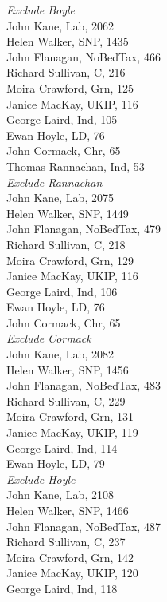 \documentclass[a4paper,openany,10pt]{book}
\begin{document}
\emph{Exclude Boyle}\\
John Kane, Lab, 2062\\
Helen Walker, SNP, 1435\\
John Flanagan, NoBedTax, 466\\
Richard Sullivan, C, 216\\
Moira Crawford, Grn, 125\\
Janice MacKay, UKIP, 116\\
George Laird, Ind, 105\\
Ewan Hoyle, LD, 76\\
John Cormack, Chr, 65\\
{Thomas Rannachan}, Ind, 53\\




\emph{{Exclude Rannachan}}\\
John Kane, Lab, 2075\\
Helen Walker, SNP, 1449\\
John Flanagan, NoBedTax, 479\\
Richard Sullivan, C, 218\\
Moira Crawford, Grn, 129\\
Janice MacKay, UKIP, 116\\
George Laird, Ind, 106\\
Ewan Hoyle, LD, 76\\
John Cormack, Chr, 65\\




\emph{Exclude Cormack}\\
John Kane, Lab, 2082\\
Helen Walker, SNP, 1456\\
John Flanagan, NoBedTax, 483\\
Richard Sullivan, C, 229\\
Moira Crawford, Grn, 131\\
Janice MacKay, UKIP, 119\\
George Laird, Ind, 114\\
Ewan Hoyle, LD, 79\\




\emph{Exclude Hoyle}\\
John Kane, Lab, 2108\\
Helen Walker, SNP, 1466\\
John Flanagan, NoBedTax, 487\\
Richard Sullivan, C, 237\\
Moira Crawford, Grn, 142\\
Janice MacKay, UKIP, 120\\
George Laird, Ind, 118\\
\end{document}
